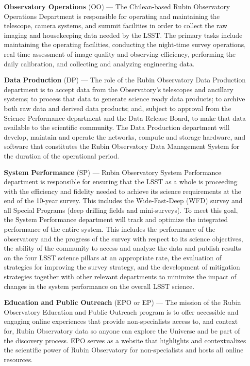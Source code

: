 \textbf{Observatory Operations} (OO) ---
The Chilean-based Rubin Observatory Operations Department is responsible for operating and maintaining the telescope, camera systems, and summit facilities in order to collect the raw imaging and housekeeping data needed by the LSST.
The primary tasks include maintaining the operating facilities, conducting the night-time survey operations, real-time assessment of image quality and observing efficiency, performing the daily calibration, and collecting and analyzing engineering data.

\textbf{Data Production} (DP) ---
The role of the Rubin Observatory Data Production department is to accept data from the Observatory's telescopes and ancillary systems; to process that data to generate science ready data products; to archive both raw data and derived data products; and, subject to approval from the Science Performance department and the Data Release Board, to make that data available to the scientific community.
The Data Production department will develop, maintain and operate the networks, compute and storage hardware, and software that constitutes the Rubin Observatory Data Management System for the duration of the operational period.

\textbf{System Performance} (SP) ---
Rubin Observatory System Performance department is responsible for ensuring that the LSST as a whole is proceeding with the efficiency and fidelity needed to achieve its science requirements at the end of the 10-year survey.
This includes the Wide-Fast-Deep (WFD) survey and all Special Programs (deep drilling fields and mini-surveys).
To meet this goal, the System Performance department will track and optimize the integrated performance of the entire system.
This includes the performance of the observatory and the progress of the survey with respect to its science objectives, the ability of the community to access and analyze the data and publish results on the four LSST science pillars at an appropriate rate, the evaluation of strategies for improving the survey strategy, and the development of mitigation strategies together with other relevant departments to minimize the impact of changes in the system performance on the overall LSST science.

\textbf{Education and Public Outreach} (EPO or EP) ---
The mission of the Rubin Observatory Education and Public Outreach program is to offer accessible and engaging online experiences that provide non-specialists access to, and context for, Rubin Observatory data so anyone can explore the Universe and be part of the discovery process.
EPO serves as a website that highlights and contextualizes the scientific power of Rubin Observatory for non-specialists and hosts all online resources.

